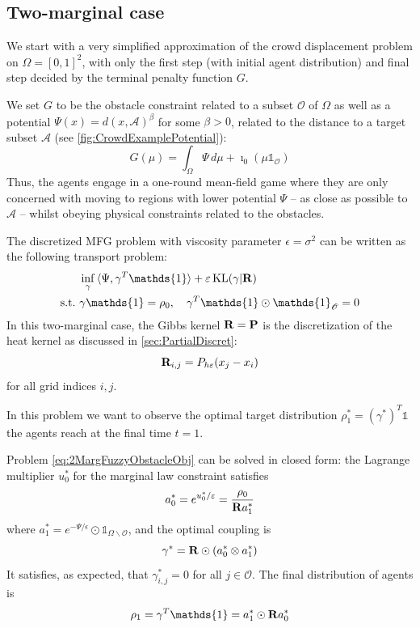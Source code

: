 \documentclass[../report.tex]{subfiles}
\begin{document}
\subsection{Two-marginal case}

We start with a very simplified approximation of the crowd displacement problem on $\Omega = [0, 1]^2$, with only the first step (with initial agent distribution) and final step decided by the terminal penalty function $G$.

We set $G$ to be the obstacle constraint  related to a subset $\mathscr{O}$ of $\Omega$ as well as a potential $\Psi(x) = d(x, \mathscr A)^{\beta}$ for some $\beta > 0$, related to the distance to a target subset $\mathscr{A}$ (see \cref{fig:CrowdExamplePotential}):
\[
	G(\mu) = \int_\Omega \Psi\,d\mu + \imath_{0}(\mu\mathds{1}_{\mathscr O})
\]
Thus, the agents engage in a one-round mean-field game where they are only concerned with moving to regions with lower potential $\Psi$ -- as close as possible to $\mathscr{A}$ -- whilst obeying physical constraints related to the obstacles.

The discretized MFG problem with viscosity parameter $\epsilon = \sigma^2$ can be written as the following transport problem:
\begin{equation}\label{eq:2MargFuzzyObstacleObj}
\begin{aligned}
	&\inf_\gamma{} \langle \Psi, \gamma^T\mathds{1}\rangle + \epsilon \KL(\gamma | \bfR) \\
	\suchthat\ & \gamma\mathds{1} = \rho_0, \quad \gamma^T\mathds{1} \odot \mathds{1}_{\mathscr{O}} = 0
	\end{aligned}
\end{equation}
In this two-marginal case, the Gibbs kernel $\mathbf{R} = \mathbf{P}$ is the discretization of the heat kernel as discussed in \cref{sec:PartialDiscret}:
\[
	\mathbf{R}_{i,j} = P_{h\varepsilon}(x_j - x_i)
\]
for all grid indices $i,j$.



In this problem we want to observe the optimal target distribution $\rho^*_1 = (\gamma^*)^T\mathds{1}$ the agents reach at the final time $t=1$.

\begin{prop}\label{thm:2MargFuzzyTarget}
Problem \eqref{eq:2MargFuzzyObstacleObj} can be solved in closed form: the Lagrange multiplier $u_0^*$ for the marginal law constraint satisfies
\[
	a_0^* = e^{u_0^*/\varepsilon}  = \frac{\rho_0}{\mathbf{R} a^*_1}
\]
where $a^*_1 = e^{-\Psi/\epsilon}\odot\mathds{1}_{\Omega\backslash\mathscr{O}}$, and the optimal coupling is
\[
	\gamma^* = \mathbf{R}\odot (a_0^* \otimes a_1^*)	
\]
It satisfies, as expected, that $\gamma^*_{i,j} = 0$ for all $j\in\mathscr{O}$. The final distribution of agents is
\[
	\rho_1 = \gamma^T\mathds{1} = a_1^* \odot \bfR a_0^*
\]
\end{prop}
 
\end{document}
